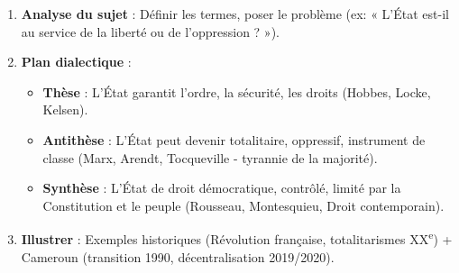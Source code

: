 \documentclass[11pt]{article}
\begin{document}
\begin{bilan}
\begin{methode}
\begin{enumerate}
    \item \textbf{Analyse du sujet} : Définir les termes, poser le problème (ex: « L'État est-il au service de la liberté ou de l'oppression ? »).
    \item \textbf{Plan dialectique} :
    \begin{itemize}
        \item \textbf{Thèse} : L'État garantit l'ordre, la sécurité, les droits (Hobbes, Locke, Kelsen).
        \item \textbf{Antithèse} : L'État peut devenir totalitaire, oppressif, instrument de classe (Marx, Arendt, Tocqueville - tyrannie de la majorité).
        \item \textbf{Synthèse} : L'État de droit démocratique, contrôlé, limité par la Constitution et le peuple (Rousseau, Montesquieu, Droit contemporain).
    \end{itemize}
    \item \textbf{Illustrer} : Exemples historiques (Révolution française, totalitarismes XX\textsuperscript{e}) + Cameroun (transition 1990, décentralisation 2019/2020).
\end{enumerate}
\end{methode}

\end{bilan}
\end{document}
